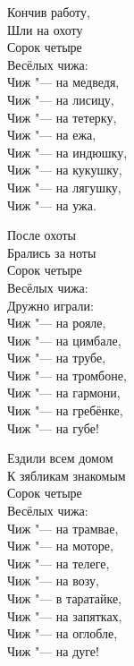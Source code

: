\begin{center}
\begin{minipage}{0.45\textwidth}
Кончив работу, \\
Шли на охоту \\
Сорок четыре \\
Весёлых чижа: \\
Чиж "--- на медведя, \\
Чиж "--- на лисицу, \\
Чиж "--- на тетерку, \\
Чиж "--- на ежа, \\
Чиж "--- на индюшку, \\
Чиж "--- на кукушку, \\
Чиж "--- на лягушку, \\
Чиж "--- на ужа. 
\end{minipage}
\end{center}
\begin{center}
\begin{minipage}{0.45\textwidth}
После охоты \\
Брались за ноты \\
Сорок четыре \\
Весёлых чижа: \\
Дружно играли: \\
Чиж "--- на рояле, \\
Чиж "--- на цимбале, \\
Чиж "--- на трубе, \\
Чиж "--- на тромбоне, \\
Чиж "--- на гармони, \\
Чиж "--- на гребёнке, \\
Чиж "--- на губе! 
\end{minipage}
\end{center}

\begin{center}
\begin{minipage}{0.5\textwidth}
Ездили всем домом \\
К зябликам знакомым \\
Сорок четыре \\
Весёлых чижа:\\ 
Чиж "--- на трамвае, \\
Чиж "--- на моторе, \\
Чиж "--- на телеге, \\
Чиж "--- на возу, \\
Чиж "--- в таратайке, \\
Чиж "--- на запятках, \\
Чиж "--- на оглобле, \\
Чиж "--- на дуге! 
\end{minipage}
\end{center}

